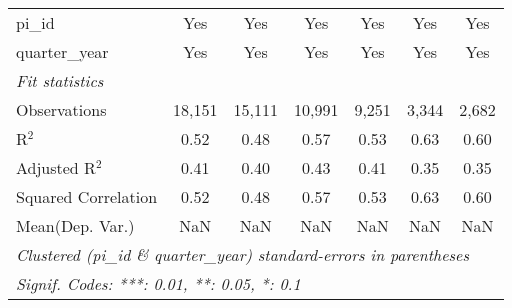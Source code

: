 \begin{tabular}{lcccccc}
   pi\_id                                                     & Yes           & Yes            & Yes           & Yes           & Yes           & Yes\\  
   quarter\_year                                              & Yes           & Yes            & Yes           & Yes           & Yes           & Yes\\  
   \midrule
   \emph{Fit statistics}\\
   Observations                                               & 18,151        & 15,111         & 10,991        & 9,251         & 3,344         & 2,682\\  
   R$^2$                                                      & 0.52          & 0.48           & 0.57          & 0.53          & 0.63          & 0.60\\  
   Adjusted R$^2$                                             & 0.41          & 0.40           & 0.43          & 0.41          & 0.35          & 0.35\\  
   Squared Correlation                                        & 0.52          & 0.48           & 0.57          & 0.53          & 0.63          & 0.60\\  
Mean(Dep. Var.) & NaN & NaN & NaN & NaN & NaN & NaN \\
   \midrule \midrule
   \multicolumn{7}{l}{\emph{Clustered (pi\_id \& quarter\_year) standard-errors in parentheses}}\\
   \multicolumn{7}{l}{\emph{Signif. Codes: ***: 0.01, **: 0.05, *: 0.1}}\\
\end{tabular}
\par\endgroup
